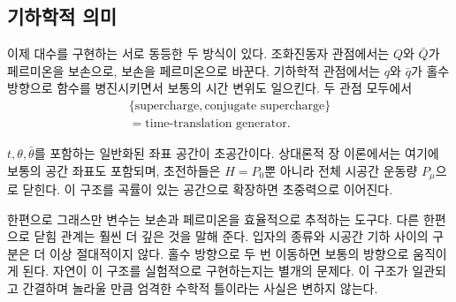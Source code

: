 \begin{classroomqa}
\end{classroomqa}


\subsection{기하학적 의미}

이제 대수를 구현하는 서로 동등한 두 방식이 있다. 조화진동자 관점에서는 \(Q\)와 \(\bar Q\)가 페르미온을 보손으로, 보손을 페르미온으로 바꾼다. 기하학적 관점에서는 \(q\)와 \(\bar q\)가 홀수 방향으로 함수를 병진시키면서 보통의 시간 변위도 일으킨다. 두 관점 모두에서
\begin{equation}
\begin{gathered}
\{\text{supercharge},\text{conjugate supercharge}\}\\
=\text{time-translation generator}.
\end{gathered}
\end{equation}

\(t,\theta,\bar\theta\)를 포함하는 일반화된 좌표 공간이 초공간이다. 상대론적 장 이론에서는 여기에 보통의 공간 좌표도 포함되며, 초전하들은 \(H=P_0\)뿐 아니라 전체 시공간 운동량 \(P_\mu\)으로 닫힌다. 이 구조를 곡률이 있는 공간으로 확장하면 초중력으로 이어진다.

한편으로 그래스만 변수는 보손과 페르미온을 효율적으로 추적하는 도구다. 다른 한편으로 닫힘 관계는 훨씬 더 깊은 것을 말해 준다. 입자의 종류와 시공간 기하 사이의 구분은 더 이상 절대적이지 않다. 홀수 방향으로 두 번 이동하면 보통의 방향으로 움직이게 된다. 자연이 이 구조를 실험적으로 구현하는지는 별개의 문제다. 이 구조가 일관되고 간결하며 놀라울 만큼 엄격한 수학적 틀이라는 사실은 변하지 않는다.
